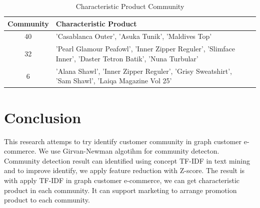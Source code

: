 \documentclass[conference]{IEEEtran}
\begin{document}
\begin{table}[h]
\renewcommand{\arraystretch}{1.3}
\caption{Characteristic Product Community}
\label{tab:result_identify_community}
\centering
\begin{tabular}{|c|p{6cm}|p{1cm}|}
    \hline
    Community  &  Characteristic Product\\
    \hline
    40 & 'Casablanca Outer', 'Asuka Tunik', 'Maldives Top'\\
    \hline
    32 & 'Pearl Glamour Peafowl', 'Inner Zipper Reguler', 'Slimface Inner', 'Daster Tetron Batik', 'Nuna Turbular'\\
    \hline
    6 & 'Alana Shawl', 'Inner Zipper Reguler', 'Grisy Sweatshirt', 'Sam Shawl', 'Laiqa Magazine Vol 25'\\
    \hline
\end{tabular}
\end{table}



\section{Conclusion}
This research attemps to try identify customer community in graph customer e-commerce. We use Girvan-Newman algotihm for community detecton. Community detection result can identified using concept TF-IDF in text mining and to improve identify, we apply feature reduction with Z-score. The result is with apply TF-IDF in graph customer e-commerce, we can get characteristic product in each community. It can support marketing to arrange promotion product to each community.


\end{document}
